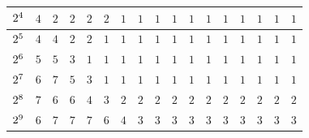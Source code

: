 \begin{table}[htb]
\begin{tabular}{| p{0.5cm} | p{0.5cm} |p{0.5cm} |p{0.5cm} |p{0.5cm} |p{0.5cm} |p{0.5cm} |p{0.5cm} |p{0.5cm} |p{0.5cm} |p{0.5cm} |p{0.5cm} |p{0.5cm} |p{0.5cm} |p{0.5cm} |p{0.5cm} |p{0.5cm} |}
\hline
$\cellcolor{gris}{2^4}$ & $4$ & $2$ & $2$ & $2$ & $2$ & $1$ & $1$ & $1$ & $1$ & $1$ & $1$ & $1$ & $1$ & $1$ & $1$ & $1$ \\
\hline
$\cellcolor{gris}{2^5}$ & $4$ & $4$ & $2$ & $2$ & $1$ & $1$ & $1$ & $1$ & $1$ & $1$ & $1$ & $1$ & $1$ & $1$ & $1$ & $1$ \\
\hline
$\cellcolor{gris}{2^6}$ & $5$ & $5$ & $3$ & $1$ & $1$ & $1$ & $1$ & $1$ & $1$ & $1$ & $1$ & $1$ & $1$ & $1$ & $1$ & $1$ \\
\hline
$\cellcolor{gris}{2^7}$ & $6$ & $7$ & $5$ & $3$ & $1$ & $1$ & $1$ & $1$ & $1$ & $1$ & $1$ & $1$ & $1$ & $1$ & $1$ & $1$ \\
\hline
$\cellcolor{gris}{2^8}$ & $7$ & $6$ & $6$ & $4$ & $3$ & $2$ & $2$ & $2$ & $2$ & $2$ & $2$ & $2$ & $2$ & $2$ & $2$ & $2$ \\
\hline
$\cellcolor{gris}{2^9}$ & $6$ & $7$ & $7$ & $7$ & $6$ & $4$ & $3$ & $3$ & $3$ & $3$ & $3$ & $3$ & $3$ & $3$ & $3$ & $3$ \\
\hline
\end{tabular}
\label{tab:saf:mvs_bi_precision}
\end{table}

